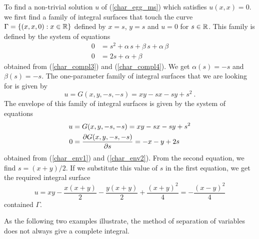 \begin{egg}
To find a non-trivial solution $u$ of (\ref{char_egg_ms}) which
satisfies $u(x,x) = 0$. we first find a family of integral surfaces
that touch the curve $\Gamma = \{ (x,x,0) : x \in \mathbb{R} \}$
defined by $x=s$, $y=s$ and $u=0$ for $s \in \mathbb{R}$.  This
family is defined by the system of equations
\begin{align*}
0 &= s^2 + \alpha \, s + \beta \, s + \alpha \, \beta \\
0 &= 2s + \alpha + \beta
\end{align*}
obtained from (\ref{char_compl3}) and (\ref{char_compl4}).
We get $\alpha(s) = -s$ and $\beta(s) = -s$.  The one-parameter family
of integral surfaces that we are looking for is given by
\[
u = G(x,y, -s, -s) = xy -s x -s y + s^2 \ .
\]
The envelope of this family of integral surfaces is given by the
system of equations
\begin{align*}
u &= G(x,y, -s, -s) = xy - s x - s y + s^2 \\
0 &= \frac{\partial{G(x,y, -s,-s)}}{\partial s} = -x - y + 2s 
\end{align*}
obtained from (\ref{char_env1}) and (\ref{char_env2}).
From the second equation, we find $s = (x+y)/2$.  If we substitute
this value of $s$ in the first equation, we get the required integral
surface
\[
u = xy - \frac{x(x+y)}{2} - \frac{y(x+y)}{2} + \frac{(x+y)^2}{4}
= - \frac{(x-y)^2}{4}
\]
contained $\Gamma$.
\end{egg}

As the following two examples illustrate, the method of separation of
variables does not always give a complete integral.


